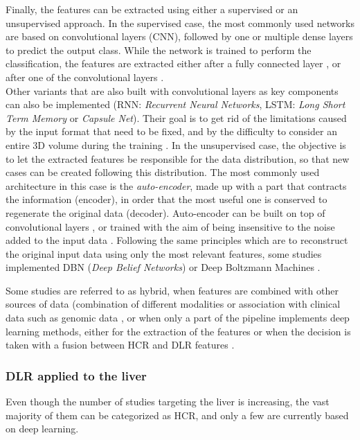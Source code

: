 \documentclass[]{article}
\begin{document}
Finally, the features can be extracted using either a supervised or an
unsupervised approach. In the supervised case, the most commonly used
networks are based on convolutional layers (CNN), followed by one
or multiple dense layers to predict the output class. While the network
is trained to perform the classification, the features are extracted
either after a fully connected layer \cite{Paul2016}, or after one of the convolutional layers \cite{Li2017}.\\
Other variants that are also built with convolutional layers as key
components can also be implemented (RNN: \emph{Recurrent Neural Networks}, LSTM: \emph{Long Short Term Memory} or
\emph{Capsule Net}). Their goal is to get rid of the limitations caused
by the input format that need to be fixed, and by the difficulty to
consider an entire 3D volume during the training \cite{Azizi2018}.
In the unsupervised case, the objective is to let the extracted features
be responsible for the data distribution, so that new cases can be
created following this distribution. The most commonly used architecture
in this case is the \emph{auto-encoder}, made up with a part that
contracts the information (encoder), in order that the most useful one
is conserved to regenerate the original data (decoder). Auto-encoder can
be built on top of convolutional layers \cite{Echaniz2017}, or trained with the aim of being insensitive to the noise
added to the input data \cite{Sun2017a,Kim2016}. Following the same principles which are to reconstruct the
original input data using only the most relevant features, some studies
implemented DBN (\emph{Deep Belief Networks}) \cite{Sun2017a} or Deep Boltzmann Machines \cite{Suk2014}.

Some studies are referred to as hybrid, when features are combined with
other sources of data (combination of different modalities \cite{Oikonomou2018} or association with clinical
data such as genomic data \cite{Emaminejad2016}, or
when only a part of the pipeline implements deep learning methods,
either for the extraction of the features \cite{Paul2016} or when the decision is taken with a fusion between HCR
and DLR features \cite{Huynh2016}.

\subsubsection{DLR applied to the liver}\label{dlr-applied-to-the-liver}

Even though the number of studies targeting the liver is increasing, the
vast majority of them can be categorized as HCR, and only a few
are currently based on deep learning.
\end{document}
